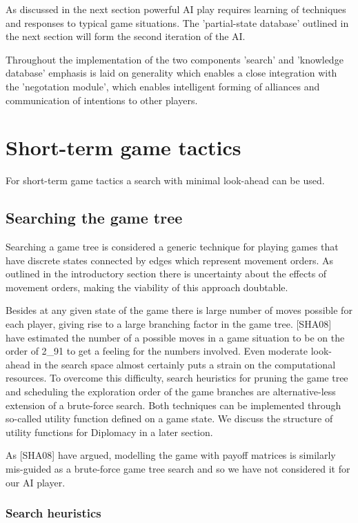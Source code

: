 \documentclass[12pt]{article}
\begin{document}
As discussed in the next section powerful AI play requires learning of
techniques and responses to typical game situations. The 'partial-state
database' outlined in the next section will form the second iteration
of the AI. 

Throughout the implementation of the two components 'search' and 'knowledge
database' emphasis is laid on generality which enables a close integration
with the 'negotation module', which enables intelligent forming of 
alliances and communication of intentions to other players.

\section{Short-term game tactics}

For short-term game tactics a search with minimal look-ahead can be used.

\subsection{Searching the game tree}

Searching a game tree is considered a generic technique for playing 
games that have discrete states connected by edges which represent movement
orders. As outlined in the introductory section there is uncertainty about
the effects of movement orders, making the viability of this approach doubtable. 

Besides at any given state of the game there is large number of moves possible
for each player, giving rise to a large branching factor in the game tree. [SHA08]
have estimated the number of a possible moves in a game situation to be on the order
of 2_{91} to get a feeling for the numbers involved. Even moderate look-ahead in
the search space almost certainly puts a strain on the computational resources.
To overcome this difficulty, search heuristics for pruning the game tree and scheduling
the exploration order of the game branches are alternative-less extension of a
brute-force search. Both techniques can be implemented through so-called utility function
defined on a game state. We discuss the structure of utility functions for Diplomacy
in a later section.

As [SHA08] have argued, modelling the game with payoff matrices is similarly mis-guided
as a brute-force game tree search and so we have not considered it for our AI player.

\subsubsection{Search heuristics}
\end{document}
